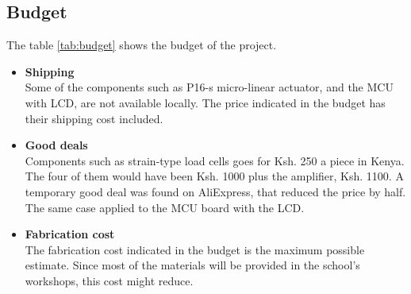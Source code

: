 \subsection{Budget}
The table \ref{tab:budget} shows the budget of the project.
\begin{table}[H]
\centering
{}
\caption{Budget}
\label{tab:budget}
\end{table}

\begin{itemize}
    \item \textbf{Shipping}\\
    Some of the components such as P16-s micro-linear actuator, and the MCU with LCD,  are not available locally. The price indicated in the budget has their shipping cost included.
    \item \textbf{Good deals}\\
    Components such as strain-type load cells goes for Ksh. 250 a piece in Kenya. The four of them would have been Ksh. 1000 plus the amplifier, Ksh. 1100. A temporary good deal was found on AliExpress, that reduced the price by half. The same case applied to the MCU board with the LCD.
    \item \textbf{Fabrication cost}\\
    The fabrication cost indicated in the budget is the maximum possible estimate. Since most of the materials will be provided in the school's workshops, this cost might reduce. 
\end{itemize}


